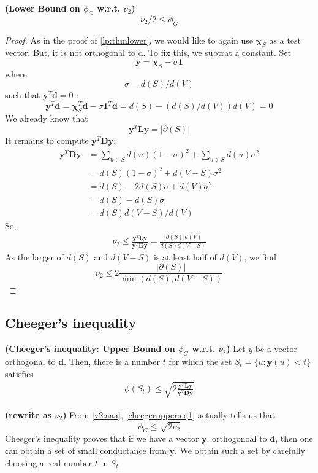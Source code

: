 \documentclass{article}
\newcommand{\bfs}[1]{\textbf{({#1}) }}
\begin{document}
\begin{thma}{\bfs{Lower Bound on $\phi_{G}$ w.r.t. $\nu_{2}$}}\label{looo}
$$
\nu_{2} / 2 \leq \phi_{G}
$$
\end{thma}
\begin{proof}
As in the proof of \cref{lp:thmlower}, we would like to again use $\boldsymbol{\chi}_{S}$ as a test vector. But, it is not orthogonal to
d. To fix this, we subtrat a constant. Set
$$
\boldsymbol{y}=\boldsymbol{\chi}_{S}-\sigma \mathbf{1}
$$
where
$$
\sigma=d(S) / d(V)
$$
such that $\boldsymbol{y}^{T} \boldsymbol{d}=0$ :
$$
\boldsymbol{y}^{T} \boldsymbol{d}=\boldsymbol{\chi}_{S}^{T} \boldsymbol{d}-\sigma \mathbf{1}^{T} \boldsymbol{d}=d(S)-(d(S) / d(V)) d(V)=0
$$
We already know that
$$
\boldsymbol{y}^{T} \boldsymbol{L} \boldsymbol{y}=|\partial(S)|
$$
It remains to compute $\boldsymbol{y}^{T} \boldsymbol{D} \boldsymbol{y}$:
$$
\begin{aligned}
\boldsymbol{y}^{T} \boldsymbol{D} \boldsymbol{y} &=\sum_{u \in S} d(u)(1-\sigma)^{2}+\sum_{u \notin S} d(u) \sigma^{2} \\
&=d(S)(1-\sigma)^{2}+d(V-S) \sigma^{2} \\
&=d(S)-2 d(S) \sigma+d(V) \sigma^{2} \\
&=d(S)-d(S) \sigma \\
&=d(S) d(V-S) / d(V)
\end{aligned}
$$
So,
\begin{align}
    \nu_{2} \leq \frac{\boldsymbol{y}^{T} \boldsymbol{L} \boldsymbol{y}}{\boldsymbol{y}^{T} \boldsymbol{D} \boldsymbol{y}}=\frac{|\partial(S)| d(V)}{d(S) d(V-S)}
    \label{lower:eqa}
\end{align}
As the larger of $d(S)$ and $d(V-S)$ is at least half of $d(V)$, we find
$$
\nu_{2} \leq 2 \frac{|\partial(S)|}{\min (d(S), d(V-S))}
$$
\end{proof}

\subsection{Cheeger's inequality}

\begin{thma}{\bfs{Cheeger's inequality: Upper Bound on $\phi_{G}$ w.r.t. $\nu_{2}$}}\label{cheegerupper}
Let $y$ be a vector orthogonal to $\boldsymbol{d}$. Then, there is a number $t$ for which the set $S_{t}=\{u: \boldsymbol{y}(u)<t\}$ satisfies
\begin{align}
  \phi\left(S_{t}\right) \leq \sqrt{2 \frac{\boldsymbol{y}^{T} \boldsymbol{L} \boldsymbol{y}}{\boldsymbol{y}^{T} \boldsymbol{D} \boldsymbol{y}}} 
  \label{cheegerupper:eq1}
\end{align}


\end{thma} 
\begin{rema}{\bfs{rewrite as $\nu_{2}$}}From \cref{v2:aaa}, \cref{cheegerupper:eq1} actually tells us that 
$$
\phi_{G} \leq \sqrt{2 \nu_{2}}
$$
Cheeger's inequality proves that if we have a vector $\boldsymbol{y}$, orthogonoal to $\boldsymbol{d}$, then one can obtain a set of small conductance from $\boldsymbol{y}$. We obtain such a set by carefully choosing a real number $t$ in $S_t$
\end{rema}
\end{document}
